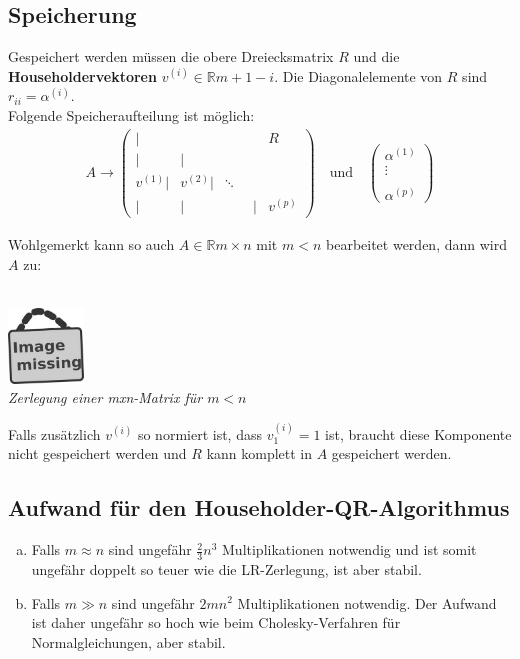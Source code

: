 \documentclass[ngerman,fontsize=11pt, paper=a4, parskip=half, titlepage=true, toc=bib]{scrbook}
\newcommand{\R}{\mathds{R}}
\newcommand{\imagemissing}[1]{
  \begin{center}~\\
    \centering 
    \includegraphics[width=2cm]{images/image_missing.jpg}\\
    \textit{#1} \\
  \end{center}
}
\begin{document}
  \subsection{Speicherung}
  Gespeichert werden müssen die obere Dreiecksmatrix $R$ und die 
  \textbf{Householdervektoren} 
  $v^{(i)}\in \R{m+1-i}$.
  Die Diagonalelemente von $R$ sind $r_{ii} = \alpha^{(i)}$. \\
  Folgende Speicheraufteilung ist möglich:
  \begin{gather*}
    A \longrightarrow \left(
      \begin{array}{rrrrr}
        |&&& R \\
        |&| \\
        v^{(1)}| & v^{(2)}|&\ddots ~~\\
        | &|&\phantom{v^{(i)}}|& v^{(p)}			
      \end{array}
    \right)
    \quad \text{und} \quad 
    \begin{pmatrix}
      \alpha^{(1)} \\ \vdots \\ \\ \alpha^{(p)}
    \end{pmatrix}
  \end{gather*}
  
  Wohlgemerkt kann so auch $A\in \R{m\times n}$ mit $m<n$ bearbeitet werden,
  dann wird $A$ zu:
  
  \imagemissing{Zerlegung einer mxn-Matrix für $m<n$}
  
  Falls zusätzlich $v^{(i)}$ so normiert ist,
  dass $v_1^{(i)} = 1$ ist, braucht diese Komponente nicht gespeichert werden 
  und $R$ kann komplett in $A$ gespeichert werden.
  
  \subsection{Aufwand für den Householder-QR-Algorithmus}
  \begin{enumerate}[a)]
  \item Falls $m\approx n$ sind ungefähr $\frac{2}{3}n^3$ Multiplikationen notwendig
    und ist somit ungefähr doppelt so teuer wie die LR-Zerlegung, ist aber stabil.
  \item Falls $m\gg n$ sind ungefähr $2mn^2$ Multiplikationen notwendig.
    Der Aufwand ist daher ungefähr so hoch wie beim Cholesky-Verfahren für Normalgleichungen,
    aber stabil.
  \end{enumerate}
  
\end{document}

